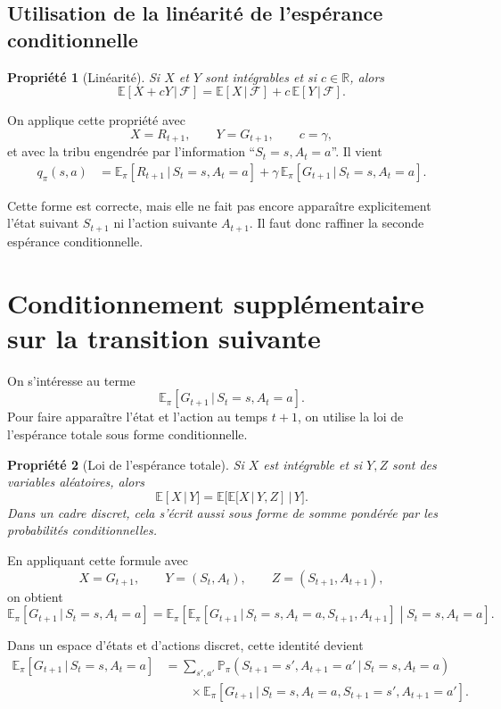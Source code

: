 \documentclass[11pt,a4paper]{article}
\newtheorem*{propriete}{Propriété}
\newcommand{\E}{\mathbb{E}}
\newcommand{\Pbb}{\mathbb{P}}
\newcommand{\R}{\mathbb{R}}
\newcommand{\given}{\,|\,}
\begin{document}
\subsection{Utilisation de la linéarité de l'espérance conditionnelle}

\begin{propriete}[Linéarité]
Si $X$ et $Y$ sont intégrables et si $c \in \R$, alors
\[
\E[X + cY \given \mathcal{F}] = \E[X \given \mathcal{F}] + c\,\E[Y \given \mathcal{F}].
\]
\end{propriete}

On applique cette propriété avec
\[
X = R_{t+1}, \qquad Y = G_{t+1}, \qquad c = \gamma,
\]
et avec la tribu engendrée par l'information ``$S_t=s, A_t=a$''. Il vient
\begin{align*}
q_{\pi}(s,a)
&= \E_{\pi}[R_{t+1} \given S_t=s, A_t=a]
+ \gamma\,\E_{\pi}[G_{t+1} \given S_t=s, A_t=a].
\end{align*}

Cette forme est correcte, mais elle ne fait pas encore apparaître explicitement l'état suivant $S_{t+1}$ ni l'action suivante $A_{t+1}$. Il faut donc raffiner la seconde espérance conditionnelle.

\section{Conditionnement supplémentaire sur la transition suivante}

On s'intéresse au terme
\[
\E_{\pi}[G_{t+1} \given S_t=s, A_t=a].
\]
Pour faire apparaître l'état et l'action au temps $t+1$, on utilise la loi de l'espérance totale sous forme conditionnelle.

\begin{propriete}[Loi de l'espérance totale]
Si $X$ est intégrable et si $Y,Z$ sont des variables aléatoires, alors
\[
\E[X \given Y] = \E\big[\E[X \given Y,Z] \given Y\big].
\]
Dans un cadre discret, cela s'écrit aussi sous forme de somme pondérée par les probabilités conditionnelles.
\end{propriete}

En appliquant cette formule avec
\[
X = G_{t+1}, \qquad Y=(S_t,A_t), \qquad Z=(S_{t+1},A_{t+1}),
\]
on obtient
\[
\E_{\pi}[G_{t+1} \given S_t=s, A_t=a]
=
\E_{\pi}\!\left[\E_{\pi}[G_{t+1} \given S_t=s, A_t=a, S_{t+1}, A_{t+1}] \middle\vert S_t=s, A_t=a\right].
\]

Dans un espace d'états et d'actions discret, cette identité devient
\begin{align*}
\E_{\pi}[G_{t+1} \given S_t=s, A_t=a]
&= \sum_{s',a'} \Pbb_{\pi}(S_{t+1}=s', A_{t+1}=a' \given S_t=s, A_t=a) \\
&\hspace{2em} \times \E_{\pi}[G_{t+1} \given S_t=s, A_t=a, S_{t+1}=s', A_{t+1}=a'].
\end{align*}
\end{document}

